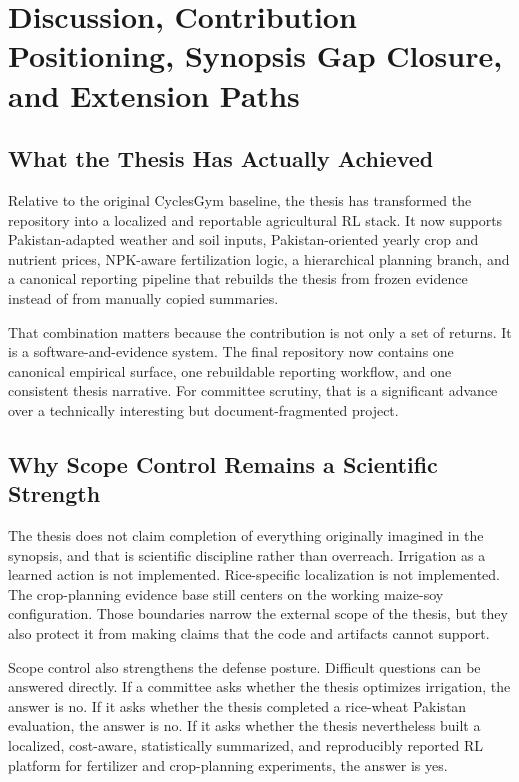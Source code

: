 \chapter{Discussion, Contribution Positioning, Synopsis Gap Closure, and Extension Paths}

\section{What the Thesis Has Actually Achieved}

Relative to the original CyclesGym baseline, the thesis has transformed the repository into a localized and reportable agricultural RL stack. It now supports Pakistan-adapted weather and soil inputs, Pakistan-oriented yearly crop and nutrient prices, NPK-aware fertilization logic, a hierarchical planning branch, and a canonical reporting pipeline that rebuilds the thesis from frozen evidence instead of from manually copied summaries.

That combination matters because the contribution is not only a set of returns. It is a software-and-evidence system. The final repository now contains one canonical empirical surface, one rebuildable reporting workflow, and one consistent thesis narrative. For committee scrutiny, that is a significant advance over a technically interesting but document-fragmented project.

\section{Why Scope Control Remains a Scientific Strength}

The thesis does not claim completion of everything originally imagined in the synopsis, and that is scientific discipline rather than overreach. Irrigation as a learned action is not implemented. Rice-specific localization is not implemented. The crop-planning evidence base still centers on the working maize-soy configuration. Those boundaries narrow the external scope of the thesis, but they also protect it from making claims that the code and artifacts cannot support.



Scope control also strengthens the defense posture. Difficult questions can be answered directly. If a committee asks whether the thesis optimizes irrigation, the answer is no. If it asks whether the thesis completed a rice-wheat Pakistan evaluation, the answer is no. If it asks whether the thesis nevertheless built a localized, cost-aware, statistically summarized, and reproducibly reported RL platform for fertilizer and crop-planning experiments, the answer is yes.

